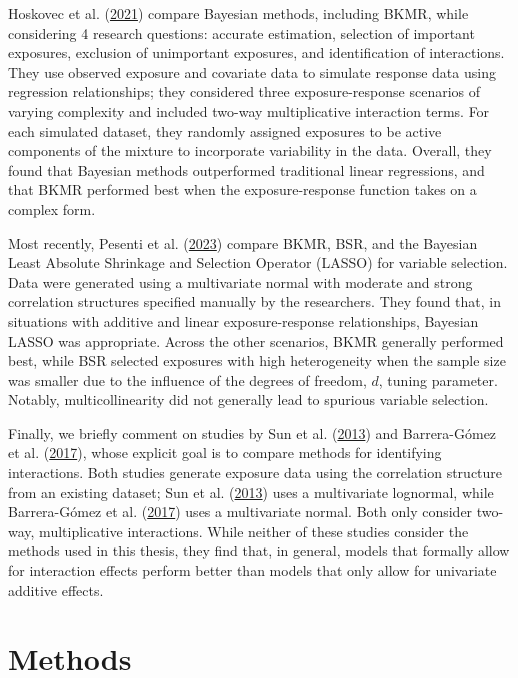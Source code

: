 \documentclass[12pt, twoside]{amherstthesis}
\begin{document}
Hoskovec et al. (\protect\hyperlink{ref-hoskovec_model_2021}{2021}) compare Bayesian methods, including BKMR, while considering 4 research questions: accurate estimation, selection of important exposures, exclusion of unimportant exposures, and identification of interactions. They use observed exposure and covariate data to simulate response data using regression relationships; they considered three exposure-response scenarios of varying complexity and included two-way multiplicative interaction terms. For each simulated dataset, they randomly assigned exposures to be active components of the mixture to incorporate variability in the data. Overall, they found that Bayesian methods outperformed traditional linear regressions, and that BKMR performed best when the exposure-response function takes on a complex form.

Most recently, Pesenti et al. (\protect\hyperlink{ref-pesenti_comparative_2023}{2023}) compare BKMR, BSR, and the Bayesian Least Absolute Shrinkage and Selection Operator (LASSO) for variable selection. Data were generated using a multivariate normal with moderate and strong correlation structures specified manually by the researchers. They found that, in situations with additive and linear exposure-response relationships, Bayesian LASSO was appropriate. Across the other scenarios, BKMR generally performed best, while BSR selected exposures with high heterogeneity when the sample size was smaller due to the influence of the degrees of freedom, \(d\), tuning parameter. Notably, multicollinearity did not generally lead to spurious variable selection.

Finally, we briefly comment on studies by Sun et al. (\protect\hyperlink{ref-sun_statistical_2013}{2013}) and Barrera-Gómez et al. (\protect\hyperlink{ref-barrera-gomez_systematic_2017}{2017}), whose explicit goal is to compare methods for identifying interactions. Both studies generate exposure data using the correlation structure from an existing dataset; Sun et al. (\protect\hyperlink{ref-sun_statistical_2013}{2013}) uses a multivariate lognormal, while Barrera-Gómez et al. (\protect\hyperlink{ref-barrera-gomez_systematic_2017}{2017}) uses a multivariate normal. Both only consider two-way, multiplicative interactions. While neither of these studies consider the methods used in this thesis, they find that, in general, models that formally allow for interaction effects perform better than models that only allow for univariate additive effects.

\hypertarget{methods}{%
\section{Methods}\label{methods}}
\end{document}
